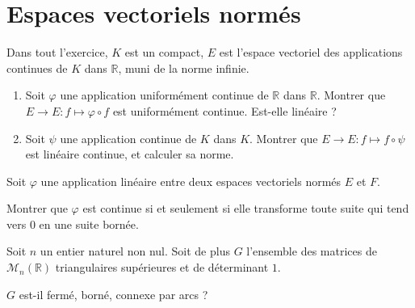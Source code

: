 \section{Espaces vectoriels norm\'es}

\begin{exer}
Dans tout l'exercice, $K$ est un compact, $E$ est l'espace vectoriel des applications continues de $K$ dans $\mathbb{R}$, muni de la norme infinie.\\
\begin{enumerate}
\item Soit $\varphi$ une application uniformément continue de $\mathbb{R}$ dans $\mathbb{R}$. %
Montrer que $E \rightarrow E : f \mapsto \varphi \circ f$ est uniformément continue. Est-elle linéaire ?
\item Soit $\psi$ une application continue de $K$ dans $K$. %
Montrer que $E \rightarrow E : f \mapsto f \circ \psi$ est linéaire continue, et calculer sa norme.
\end{enumerate}
\end{exer}

\begin{exer}
Soit $\varphi$ une application lin\'eaire entre deux espaces vectoriels norm\'es $E$ et $F$.

Montrer que $\varphi$ est continue si et seulement si elle transforme toute suite qui tend vers $0$ en une suite bornée.
\end{exer}

\begin{exer}
Soit $n$ un entier naturel non nul. %
Soit de plus $G$ l'ensemble des matrices de $\mathcal{M}_n(\mathbb{R})$ triangulaires supérieures et de d\'eterminant $1$.

$G$ est-il fermé, borné, connexe par arcs ?
\end{exer}

